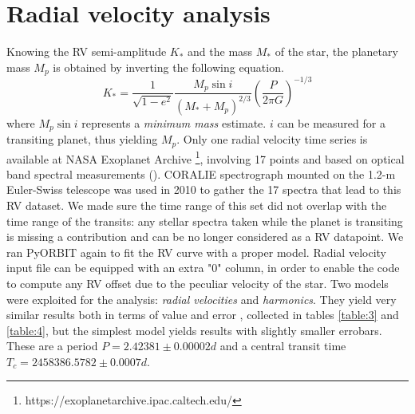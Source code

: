 \documentclass[a4paper,11pt,twocolumn]{article}
\begin{document}
\section{Radial velocity analysis}
Knowing the RV semi-amplitude $K_*$ and the mass $M_*$ of the star,
the planetary mass $M_p$ is obtained by inverting the following equation. 
\begin{equation}
    K_* = \frac{1}{\sqrt{1-e^2}}\frac{M_p \sin{i}}{(M_*+M_p)^{2/3}}\left(\frac{P}{2\pi G}\right)^{-1/3}
\end{equation}
where $M_p\sin{i}$ represents a \textit{minimum mass} estimate. $i$ can be 
measured for a transiting planet, thus yielding $M_p$. 
Only one radial velocity time series
is available at NASA Exoplanet Archive \footnote{https://exoplanetarchive.ipac.caltech.edu/}, 
involving 17 points and based on optical band spectral measurements 
(\cite{Anderson}). CORALIE spectrograph mounted on the 1.2-m
Euler-Swiss telescope was used in 2010 to gather the 17 spectra that lead
to this RV dataset. We made sure the time range of this set did not overlap 
with the time range of the transits: any stellar spectra taken while the planet is 
transiting is missing a contribution and can be no longer considered as a RV 
datapoint.
We ran PyORBIT again to fit the RV curve with a proper model. Radial velocity input
file can be equipped with an extra "0" column, in order to enable the code to compute
any RV offset due to the peculiar velocity of the star.
Two models were exploited for the analysis: \textit{radial velocities} and 
\textit{harmonics}. 
They yield very 
similar results both in terms of value and error , collected in tables \ref{table:3} and \ref{table:4}, but the simplest model yields results with slightly 
smaller errobars. These are a period $P=2.42381\pm0.00002d$
and a central transit time $T_c=2458386.5782\pm0.0007d$.

\begin{table}[h!]
    \centering
     \caption{Physical parameters obtained for \textit{radial velocities} model.}
\label{table:3}
\end{table}
\end{document}
